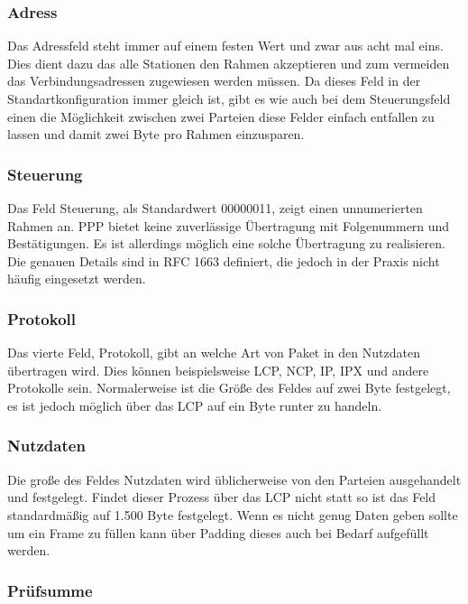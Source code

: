 \documentclass[12pt, a4paper, ngerman]{article}
\begin{document}
\subsubsection{Adress}

Das Adressfeld steht immer auf einem festen Wert und zwar aus acht mal eins. Dies dient dazu das alle Stationen den Rahmen akzeptieren und zum vermeiden das Verbindungsadressen zugewiesen werden müssen. Da dieses Feld in der Standartkonfiguration immer gleich ist, gibt es wie auch bei dem Steuerungsfeld einen die Möglichkeit zwischen zwei Parteien diese Felder einfach entfallen zu lassen und damit zwei Byte pro Rahmen einzusparen.


\subsubsection{Steuerung}

Das Feld Steuerung, als Standardwert 00000011, zeigt einen unnumerierten Rahmen an. PPP bietet keine zuverlässige Übertragung mit Folgenummern und Bestätigungen. Es ist allerdings möglich eine solche Übertragung zu realisieren. Die genauen Details sind in RFC 1663 definiert, die jedoch in der Praxis nicht häufig eingesetzt werden.


\subsubsection{Protokoll}

Das vierte Feld, Protokoll, gibt an welche Art von Paket in den Nutzdaten übertragen wird. Dies können beispielsweise LCP, NCP, IP, IPX und andere Protokolle sein. Normalerweise ist die Größe des Feldes auf zwei Byte festgelegt, es ist jedoch möglich über das LCP auf ein Byte runter zu handeln.


\subsubsection{Nutzdaten}

Die große des Feldes Nutzdaten wird üblicherweise von den Parteien ausgehandelt und festgelegt. Findet dieser Prozess über das LCP nicht statt so ist das Feld standardmäßig auf 1.500 Byte festgelegt.
Wenn es nicht genug Daten geben sollte um ein Frame zu füllen kann über Padding dieses auch bei Bedarf aufgefüllt werden.

\subsubsection{Prüfsumme}
\end{document}
